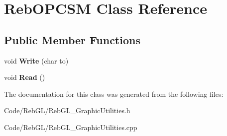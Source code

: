 \hypertarget{class_reb_o_p_c_s_m}{}\section{Reb\+O\+P\+C\+SM Class Reference}
\label{class_reb_o_p_c_s_m}
\subsection*{Public Member Functions}
\begin{DoxyCompactItemize}
\item 
void {\bfseries Write} (char to)\hypertarget{class_reb_o_p_c_s_m_a7c6eea33e2086f5fb825b1f668ed07fd}{}\label{class_reb_o_p_c_s_m_a7c6eea33e2086f5fb825b1f668ed07fd}

\item 
void {\bfseries Read} ()\hypertarget{class_reb_o_p_c_s_m_a8564e90199fbdf530ab96fd637197505}{}\label{class_reb_o_p_c_s_m_a8564e90199fbdf530ab96fd637197505}

\end{DoxyCompactItemize}


The documentation for this class was generated from the following files\+:\begin{DoxyCompactItemize}
\item 
Code/\+Reb\+G\+L/Reb\+G\+L\+\_\+\+Graphic\+Utilities.\+h\item 
Code/\+Reb\+G\+L/Reb\+G\+L\+\_\+\+Graphic\+Utilities.\+cpp\end{DoxyCompactItemize}
